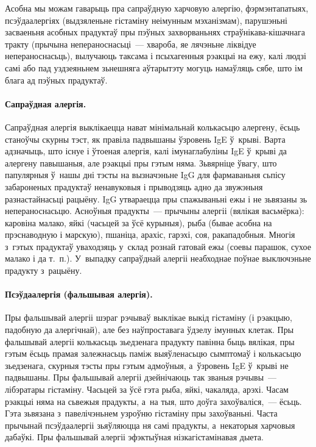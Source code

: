 Асобна мы можам гаварыць пра сапраўдную харчовую алергію, фэрмэнтапатыях, псэўдаалергіях (выдзяленьне гістаміну неімунным мэханізмам), парушэньні засваеньня асобных прадуктаў пры пэўных захворваньнях страўнікава-кішачнага тракту (прычына непераноснасьці~--- хвароба, яе лячэньне ліквідуе непераноснасьць), вылучаюць таксама і псыхагенныя рэакцыі на ежу, калі людзі самі або пад уздзеяньнем зьнешняга аўтарытэту могуць намаўляць сябе, што ім блага ад пэўных прадуктаў.

\paragraph{Сапраўдная алергія.}
Сапраўдная алергія выклікаецца нават мінімальнай колькасьцю алергену, ёсьць станоўчы скурны тэст, як правіла падвышаны ўзровень IgE ў~крыві. Варта адзначыць, што існуе і ўтоеная алергія, калі імунаглабуліны IgE ў~крыві да алергену павышаныя, але рэакцыі пры гэтым няма. Зьвярніце ўвагу, што папулярныя ў~нашы дні тэсты на вызначэньне IgG для фармаваньня сьпісу забароненых прадуктаў ненавуковыя і прыводзяць адно да звужэньня разнастайнасьці рацыёну. IgG утвараецца пры спажываньні ежы і не зьвязаны зь непераноснасьцю. Асноўныя прадукты~--- прычыны алергіі (вялікая васьмёрка): каровіна малако, яйкі (часьцей за ўсё курыныя), рыба (бывае асобна на прэснаводную і марскую), пшаніца, арахіс, гарэхі, соя, ракападобныя. Многія з~гэтых прадуктаў уваходзяць у~склад рознай гатовай ежы (соевы парашок, сухое малако і да т.~п.). У~выпадку сапраўднай алергіі неабходнае поўнае выключэньне прадукту з~рацыёну.

\paragraph{Псэўдаалергія (фальшывая алергія).}
Пры фальшывай алергіі шэраг рэчываў выклікае выкід гістаміну (і рэакцыю, падобную да алергічнай), але без наўпроставага ўдзелу імунных клетак. Пры фальшывай алергіі колькасьць зьедзенага прадукту павінна быць вялікая, пры гэтым ёсьць прамая залежнасьць паміж выяўленасьцю сымптомаў і колькасьцю зьедзенага, скурныя тэсты пры гэтым адмоўныя, а~ўзровень IgE ў~крыві не падвышаны. Пры фальшывай алергіі дзейнічаюць так званыя рэчывы~--- лібэратары гістаміну. Часьцей за ўсё гэта рыба, яйкі, чакаляда, арэхі. Часам рэакцыі няма на сьвежыя прадукты, а~на тыя, што доўга захоўваліся,~--- ёсьць. Гэта зьвязана з~павелічэньнем узроўню гістаміну пры захоўваньні. Часта прычынай псэўдаалергіі зьяўляюцца ня самі прадукты, а~некаторыя харчовыя дабаўкі. Пры фальшывай алергіі эфэктыўная нізкагістамінавая дыета.

